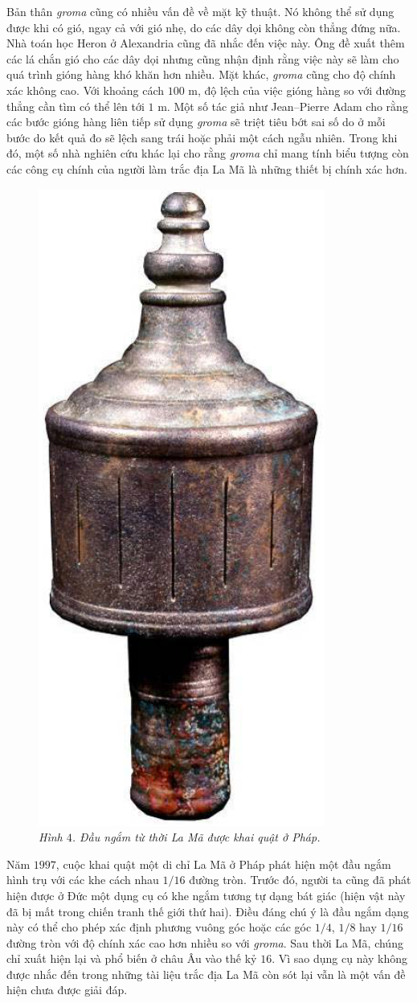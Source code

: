 \begin{multicols}{2}
	\vskip 0.1cm
	Bản thân \textit{groma} cũng có nhiều vấn đề về mặt kỹ thuật. Nó không thể sử dụng được khi có gió, ngay cả với gió nhẹ, do các dây dọi không còn thẳng đứng nữa. Nhà toán học Heron ở Alexandria cũng đã nhắc đến việc này. Ông đề xuất thêm các lá chắn gió cho các dây dọi nhưng cũng nhận định rằng việc này sẽ làm cho quá trình gióng hàng khó khăn hơn nhiều. Mặt khác, \textit{groma} cũng cho độ chính xác không cao. Với khoảng cách $100$ m, độ lệch của việc gióng hàng so với đường thẳng cần tìm có thể lên tới $1$ m. Một số tác giả như Jean--Pierre Adam cho rằng các bước gióng hàng liên tiếp sử dụng \textit{groma} sẽ triệt tiêu bớt sai số do ở mỗi bước do kết quả đo sẽ lệch sang trái hoặc phải một cách ngẫu nhiên. Trong khi đó, một số nhà nghiên cứu khác lại cho rằng \textit{groma} chỉ mang tính biểu tượng còn các công cụ chính của người làm trắc địa La Mã là những thiết bị chính xác hơn.
	\begin{figure}[H]
		\vspace*{-5pt}
		\centering
		\captionsetup{labelformat= empty, justification=centering}
		\includegraphics[width= 0.4\linewidth]{4}
		\caption{\small\textit{\color{toanhocdoisong}Hình $4$. Đầu ngắm từ thời La Mã được khai quật ở Pháp.}}
		\vspace*{-10pt}
	\end{figure}
	Năm $1997$, cuộc khai quật một di chỉ La Mã ở Pháp phát hiện một đầu ngắm hình trụ với các khe cách nhau $1/16$ đường tròn. Trước đó, người ta cũng đã phát hiện được ở Đức một dụng cụ có khe ngắm tương tự dạng bát giác (hiện vật này đã bị mất trong chiến tranh thế giới thứ hai). Điều đáng chú ý là đầu ngắm dạng này có thể cho phép xác định phương vuông góc hoặc các góc $1/4$, $1/8$ hay $1/16$  đường tròn với độ chính xác cao hơn nhiều so với \textit{groma}. Sau thời La Mã, chúng chỉ xuất hiện lại và phổ biến ở châu Âu vào thế kỷ $16$. Vì sao dụng cụ này không được nhắc đến trong những tài liệu trắc địa La Mã còn sót lại vẫn là một vấn đề hiện chưa được giải đáp.

\end{multicols}
